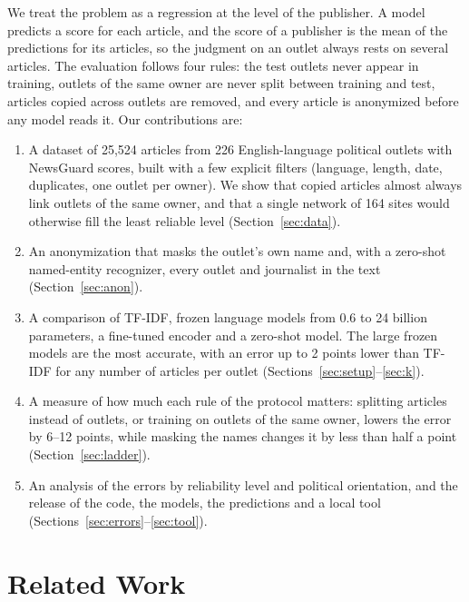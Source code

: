 \documentclass[11pt,a4paper]{article}
\begin{document}
We treat the problem as a regression at the level of the publisher. A model predicts a score for each article, and the
score of a publisher is the mean of the predictions for its articles, so the judgment on an outlet always rests on
several articles. The evaluation follows four rules: the test outlets never appear in training, outlets of the same
owner are never split between training and test, articles copied across outlets are removed, and every article is
anonymized before any model reads it. Our contributions are:
\begin{enumerate}
  \item A dataset of 25,524 articles from 226 English-language political outlets with NewsGuard scores, built with a few
        explicit filters (language, length, date, duplicates, one outlet per owner). We show that copied articles almost
        always link outlets of the same owner, and that a single network of 164 sites would otherwise fill the least
        reliable level (Section~\ref{sec:data}).
  \item An anonymization that masks the outlet's own name and, with a zero-shot named-entity recognizer, every outlet and
        journalist in the text (Section~\ref{sec:anon}).
  \item A comparison of TF-IDF, frozen language models from 0.6 to 24 billion parameters, a fine-tuned encoder and a
        zero-shot model. The large frozen models are the most accurate, with an error up to 2 points lower than TF-IDF
        for any number of articles per outlet (Sections~\ref{sec:setup}--\ref{sec:k}).
  \item A measure of how much each rule of the protocol matters: splitting articles instead of outlets, or training on
        outlets of the same owner, lowers the error by 6--12 points, while masking the names changes it by less than
        half a point (Section~\ref{sec:ladder}).
  \item An analysis of the errors by reliability level and political orientation, and the release of the code, the
        models, the predictions and a local tool (Sections~\ref{sec:errors}--\ref{sec:tool}).
\end{enumerate}

\section{Related Work}\label{sec:related}
\end{document}
